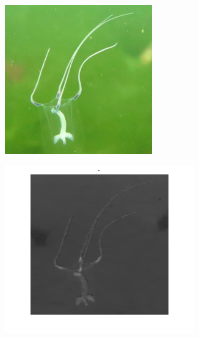 \documentclass{article}
\begin{document}
\begin{figure}[H]
	\begin{subfigure}{0.5\textwidth}
	\centering
        \includegraphics[width=0.7\textwidth]{1901xx.png}
    \end{subfigure}\hfill
	\begin{subfigure}{0.5\textwidth}
	\centering
        \includegraphics[width=0.9\textwidth]{1901-hsi-h.png}
    \end{subfigure}\hfill
	\begin{subfigure}{0.5\textwidth}
	\centering

\end{subfigure}
\end{figure}
\end{document}
